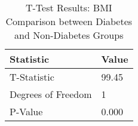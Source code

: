 
\begin{table}[h!]
\centering
\begin{tabular}{|l|l|}
\hline
\textbf{Statistic}       & \textbf{Value} \\ \hline
T-Statistic                & 99.45     \\ \hline
Degrees of Freedom          & 1          \\ \hline
P-Value                    & 0.000      \\ \hline
\end{tabular}

\vspace{0.5cm} %

\caption{T-Test Results: BMI Comparison between Diabetes and Non-Diabetes Groups}
\label{tab:t_test_bmi_results}
\end{table}

